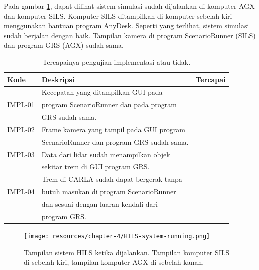 Pada gambar \ref{chapter-4-fig-hils-running}, dapat dilihat sistem simulasi
sudah dijalankan di komputer AGX dan komputer SILS. Komputer SILS ditampilkan di
komputer sebelah kiri menggunakan bantuan program AnyDesk. Seperti yang
terlihat, sistem simulasi sudah berjalan dengan baik. Tampilan kamera di program
ScenarioRunner (SILS) dan program GRS (AGX) sudah sama.

\begin{table}[!htbp]
	\begin{center}
		\begin{tabular}{|l|l|l|}
			\hline
			\textbf{Kode} & \textbf{Deskripsi}                         & \textbf{Tercapai} \\
			\hline
			              & Kecepatan yang ditampilkan GUI pada        &                   \\
			IMPL-01       & program ScenarioRunner dan pada program    & \checkmark        \\
			              & GRS sudah sama.                            &                   \\
			\hline
			IMPL-02       & Frame kamera yang tampil pada GUI program  & \checkmark        \\
			              & ScenarioRunner dan program GRS sudah sama. &                   \\
			\hline
			IMPL-03       & Data dari lidar sudah menampilkan objek    & \checkmark        \\
			              & sekitar trem di GUI program GRS.           &                   \\
			\hline
			              & Trem di CARLA sudah dapat bergerak tanpa   &                   \\
			IMPL-04       & butuh masukan di program ScenarioRunner    & \checkmark        \\
			              & dan sesuai dengan luaran kendali dari      &                   \\
			              & program GRS.                               &                   \\
			\hline
		\end{tabular}
	\end{center}

	\caption{Tercapainya pengujian implementasi atau tidak.}
	\label{chapter-4-tbl-impl-criteria-result}
\end{table}

\begin{figure}[!htbp]
	\centering
	\texttt{[image: resources/chapter-4/HILS-system-running.png]}
	\caption{Tampilan sistem HILS ketika dijalankan. Tampilan komputer SILS di
		sebelah kiri, tampilan komputer AGX di sebelah kanan.}
	\label{chapter-4-fig-hils-running}
\end{figure}

